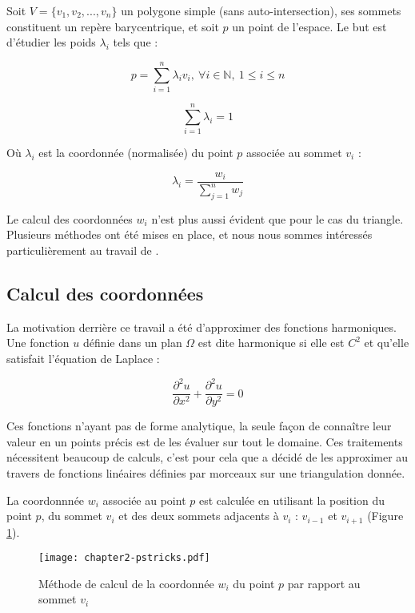 Soit $V = \{v_1, v_2, ..., v_n\}$ un polygone simple (sans auto-intersection),
ses sommets constituent un repère barycentrique, et soit $p$ un point de
l'espace. Le but est d'étudier les poids $\lambda_i$ tels que :

\begin{equation}
  p = \sum_{i=1}^{n} \lambda_i v_i ,
  ~ \forall i \in \mathbb{N} ,~ 1 \leq i \leq n
\end{equation}

\begin{equation}
  \sum_{i=1}^n \lambda_i = 1
\end{equation}

Où $\lambda_i$ est la coordonnée (normalisée) du point $p$ associée au sommet
$v_i$ :

\begin{equation}
  \lambda_i = \frac{w_i}{\sum_{j=1}^n w_j}
\end{equation}

Le calcul des coordonnées $w_i$ n'est plus aussi évident que pour le cas du
triangle. Plusieurs méthodes ont été mises en place, et nous nous sommes
intéressés particulièrement au travail de \cite{Flo03}.

\subsection{Calcul des coordonnées}

La motivation derrière ce travail a été d'approximer des fonctions harmoniques.
Une fonction $u$ définie dans un plan $\Omega$ est dite harmonique si elle est
$C^2$ et qu'elle satisfait l'équation de Laplace :

\begin{equation}
  \frac{\partial^2 u}{\partial x^2} + \frac{\partial^2 u}{\partial y^2} = 0
\end{equation}

Ces fonctions n'ayant pas de forme analytique, la seule façon de connaître leur
valeur en un points précis est de les évaluer sur tout le domaine. Ces
traitements nécessitent beaucoup de calculs, c'est pour cela que \cite{Flo03} a
décidé de les approximer au travers de fonctions linéaires définies par morceaux
sur une triangulation donnée.

La coordonnnée $w_i$ associée au point $p$ est calculée en utilisant la
position du point $p$, du sommet $v_i$ et des deux sommets adjacents à $v_i$ :
$v_{i-1}$ et $v_{i+1}$ (Figure \ref{DEFcal}).

\begin{figure}[ht]
  \begin{center}
    \texttt{[image: chapter2-pstricks.pdf]}
    \caption{Méthode de calcul de la coordonnée $w_i$ du point $p$ par rapport
    au sommet $v_i$}
    \label{DEFcal}
  \end{center}
\end{figure}

